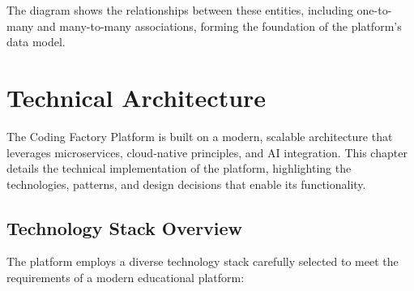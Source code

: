 \documentclass[12pt,a4paper]{report}
\begin{document}
The diagram shows the relationships between these entities, including one-to-many and many-to-many associations, forming the foundation of the platform's data model.



\chapter{Technical Architecture}

The Coding Factory Platform is built on a modern, scalable architecture that leverages microservices, cloud-native principles, and AI integration. This chapter details the technical implementation of the platform, highlighting the technologies, patterns, and design decisions that enable its functionality.

\section{Technology Stack Overview}

The platform employs a diverse technology stack carefully selected to meet the requirements of a modern educational platform:
\end{document}
